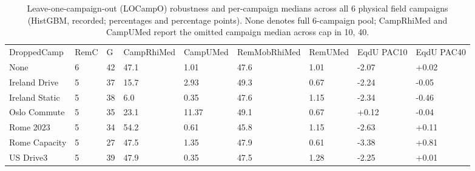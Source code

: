 \begin{table}[!ht]
\centering\footnotesize\setlength{\tabcolsep}{2.4pt}
\caption{Leave-one-campaign-out (LOCampO) robustness and per-campaign medians across all 6 physical field campaigns (HistGBM, recorded; percentages and percentage points). None denotes full 6-campaign pool; CampRhiMed and CampUMed report the omitted campaign median across cap in {10, 40}.}
\begin{tabular}{lllllllll}
\hline
DroppedCamp & RemC & G & CampRhiMed & CampUMed & RemMobRhiMed & RemUMed & EqdU PAC10 & EqdU PAC40 \\
None & 6 & 42 & 47.1 & 1.01 & 47.6 & 1.01 & -2.07 & +0.02 \\
Ireland Drive & 5 & 37 & 15.7 & 2.93 & 49.3 & 0.67 & -2.24 & -0.05 \\
Ireland Static & 5 & 38 & 6.0 & 0.35 & 47.6 & 1.15 & -2.34 & -0.46 \\
Oslo Commute & 5 & 35 & 23.1 & 11.37 & 49.1 & 0.67 & +0.12 & -0.04 \\
Rome 2023 & 5 & 34 & 54.2 & 0.61 & 45.8 & 1.15 & -2.63 & +0.11 \\
Rome Capacity & 5 & 27 & 47.5 & 1.35 & 47.9 & 0.61 & -3.38 & +0.81 \\
US Drive3 & 5 & 39 & 47.9 & 0.35 & 47.5 & 1.28 & -2.25 & +0.01 \\
\hline
\end{tabular}
\end{table}
